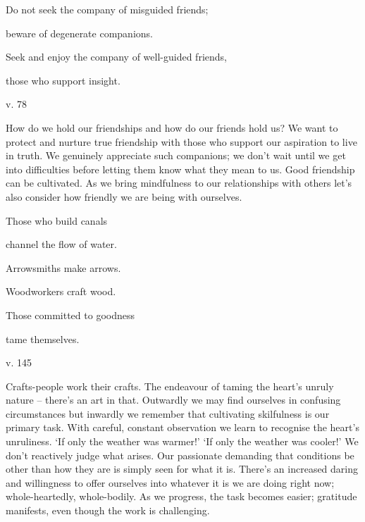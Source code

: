 \documentclass[a4paper,portrait,12pt]{article}
\begin{document}
Do not seek the company of misguided friends;


beware of degenerate companions.


Seek and enjoy the company of well-guided friends, 


those who support insight. 





v. 78 





How do we hold our friendships and how do our friends hold us? We want to protect and nurture true friendship with those who support our aspiration to live in truth. We genuinely appreciate such companions; we don't wait until we get into difficulties before letting them know what they mean to us. Good friendship can be cultivated. As we bring mindfulness to our relationships with others let's also consider how friendly we are being with ourselves.














Those who build canals


channel the flow of water.


Arrowsmiths make arrows.


Woodworkers craft wood.


Those committed to goodness 


tame themselves.





v. 145 





Crafts-people work their crafts. The endeavour of taming the heart's unruly nature -- there's an art in that. Outwardly we may find ourselves in confusing circumstances but inwardly we remember that cultivating skilfulness is our primary task. With careful, constant observation we learn to recognise the heart's unruliness. `If only the weather was warmer!' `If only the weather was cooler!' We don't reactively judge what arises. Our passionate demanding that conditions be other than how they are is simply seen for what it is. There's an increased daring and willingness to offer ourselves into whatever it is we are doing right now; whole-heartedly, whole-bodily. As we progress, the task becomes easier; gratitude manifests, even though the work is challenging.
\end{document}
